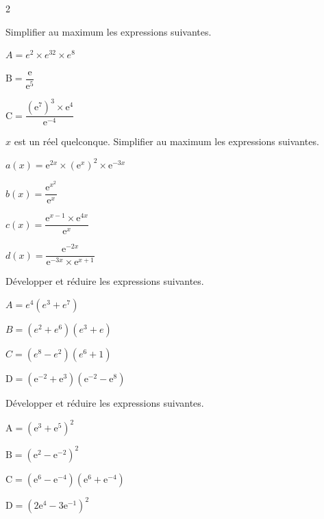 \documentclass[11pt,a4paper]{article}  %
\begin{document}
\begin{multicols}{2}

Simplifier au maximum les expressions suivantes.
\begin{enumMet}
	\item $A=e^2 \times e^{32} \times e^8$
	\item $\mathrm{B}=\dfrac{\mathrm{e}}{\mathrm{e}^5}$
	\item $\mathrm{C}=\dfrac{\left(\mathrm{e}^7\right)^3 \times \mathrm{e}^4}{\mathrm{e}^{-4}}$
\end{enumMet}


$x$ est un réel quelconque. Simplifier au maximum les expressions suivantes.
\begin{enumMet}
	\item $a(x)=\mathrm{e}^{2 x} \times\left(\mathrm{e}^x\right)^2 \times \mathrm{e}^{-3 x}$
	\item $b(x)=\dfrac{\mathrm{e}^{x^2}}{\mathrm{e}^x}$
	\item $c(x)=\dfrac{\mathrm{e}^{x-1} \times \mathrm{e}^{4 x}}{\mathrm{e}^x}$
	\item $d(x)=\dfrac{\mathrm{e}^{-2 x}}{\mathrm{e}^{-3 x} \times \mathrm{e}^{x+1}}$
\end{enumMet}
\columnbreak



Développer et réduire les expressions suivantes.
\begin{enumMet}
	\item $A=e^4\left(e^3+e^7\right)$
	\item $B=\left(e^2+e^6\right)\left(e^3+e\right)$
	\item $C=\left(e^8-e^2\right)\left(e^6+1\right)$
	\item $\mathrm{D}=\left(\mathrm{e}^{-2}+\mathrm{e}^3\right)\left(\mathrm{e}^{-2}-\mathrm{e}^8\right)$
\end{enumMet}



Développer et réduire les expressions suivantes.
\begin{enumMet}
	\item $\mathrm{A}=\left(\mathrm{e}^3+\mathrm{e}^5\right)^2$
	\item $\mathrm{B}=\left(\mathrm{e}^2-\mathrm{e}^{-2}\right)^2$
	\item  $\mathrm{C}=\left(\mathrm{e}^6-\mathrm{e}^{-4}\right)\left(\mathrm{e}^6+\mathrm{e}^{-4}\right)$
	\item $\mathrm{D}=\left(2 \mathrm{e}^4-3 \mathrm{e}^{-1}\right)^2$
\end{enumMet}
\end{multicols}
\end{document}
